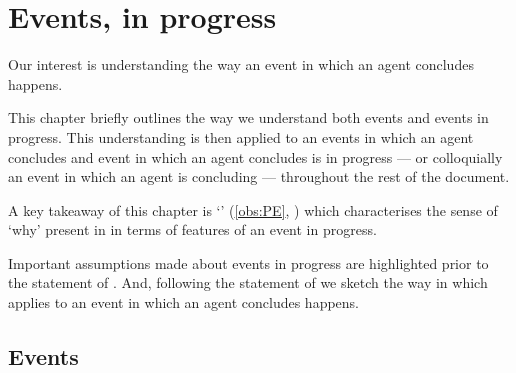 \chapter{Events, in progress}
\label{cha:events-progress}


\begin{note}
  Our interest is understanding the way an event in which an agent concludes happens.

  This chapter briefly outlines the way we understand both events and events in progress.
  This understanding is then applied to an events in which an agent concludes and event in which an agent concludes is in progress --- or colloquially an event in which an agent is concluding --- throughout the rest of the document.

  A key takeaway of this chapter is `\progEx{}' (\autoref{obs:PE}, ) which characterises the sense of `why' present in \qWhy{} in terms of features of an event in progress.

  Important assumptions made about events in progress are highlighted prior to the statement of \progEx{}.
  And, following the statement of \progEx{} we sketch the way in which \progEx{} applies to an event in which an agent concludes happens.
\end{note}


\section{Events}
\label{sec:events}

